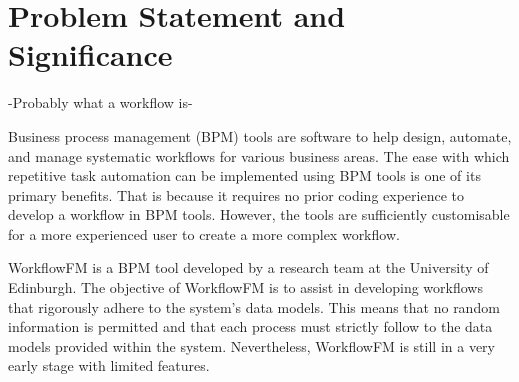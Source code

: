 






\section{Problem Statement and Significance}

-Probably what a workflow is-

Business process management (BPM) tools are software to help design, automate, and manage systematic workflows for various business areas. The ease with which repetitive task automation can be implemented using BPM tools is one of its primary benefits. That is because it requires no prior coding experience to develop a workflow in BPM tools. However, the tools are sufficiently customisable for a more experienced user to create a more complex workflow.


WorkflowFM \cite{papapanagiotou2017workflowfm} is a BPM tool developed by a research team at the University of Edinburgh.
The objective of WorkflowFM is to assist in developing workflows that rigorously adhere to the system's data models. This means that no random information is permitted and that each process must strictly follow to the data models provided within the system.
Nevertheless, WorkflowFM is still in a very early stage with limited features.

